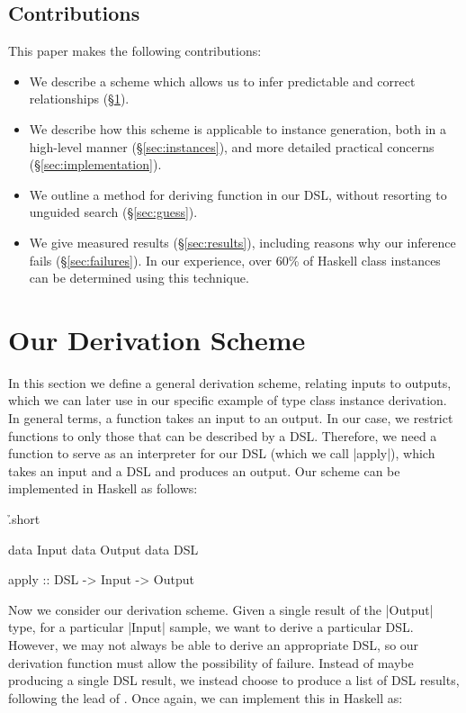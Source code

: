 \documentclass[preprint]{sigplanconf}
\begin{document}
\subsection{Contributions}

This paper makes the following contributions:

\begin{itemize}
\item We describe a scheme which allows us to infer predictable and correct relationships (\S\ref{sec:scheme}).
\item We describe how this scheme is applicable to instance generation, both in a high-level manner (\S\ref{sec:instances}), and more detailed practical concerns (\S\ref{sec:implementation}).
\item We outline a method for deriving function in our DSL, without resorting to unguided search (\S\ref{sec:guess}).
\item We give measured results (\S\ref{sec:results}), including reasons why our inference fails (\S\ref{sec:failures}). In our experience, over 60\% of Haskell class instances can be determined using this technique.
\end{itemize}

\section{Our Derivation Scheme}
\label{sec:scheme}

In this section we define a general derivation scheme, relating inputs to outputs, which we can later use in our specific example of type class instance derivation. In general terms, a function takes an input to an output. In our case, we restrict functions to only those that can be described by a DSL. Therefore, we need a function to serve as an interpreter for our DSL (which we call |apply|), which takes an input and a DSL and produces an output. Our scheme can be implemented in Haskell as follows:

\h{.short}\begin{code}
data Input
data Output
data DSL

apply :: DSL -> Input -> Output
\end{code}

Now we consider our derivation scheme. Given a single result of the |Output| type, for a particular |Input| sample, we want to derive a particular DSL. However, we may not always be able to derive an appropriate DSL, so our derivation function must allow the possibility of failure. Instead of maybe producing a single DSL result, we instead choose to produce a list of DSL results, following the lead of \citet{wadler:list_of_successes}. Once again, we can implement this in Haskell as:
\end{document}
